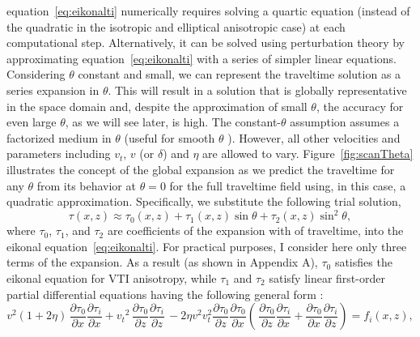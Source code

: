 

 equation~\ref{eq:eikonalti}  numerically requires
 solving a quartic equation (instead of the quadratic in the isotropic and elliptical
anisotropic case) at each computational step. Alternatively, it  can be solved using perturbation theory \cite[]{Bender}
by approximating equation~\ref{eq:eikonalti} with a series of simpler linear equations. Considering $\theta$
constant and small, we can represent the traveltime solution as a series expansion in $\theta$. This will result in a solution that is globally representative in the
space domain and, despite the approximation of small $\theta$, 
the accuracy for even large $\theta$, as we will see later, is high. The constant-$\theta$ assumption
assumes a factorized medium \cite[]{alkhalifah:1139}
 in $\theta$ (useful for smooth $\theta$ ). However,
all other velocities and parameters including $v_t$, $v$ (or $\delta$) and $\eta$ are allowed to vary.
Figure~\ref{fig:scanTheta} illustrates
the concept of the global expansion as we predict the traveltime for
any $\theta$ from its behavior at $\theta=0$ for the full traveltime
field
using, in this case, a quadratic approximation. Specifically, we
 substitute the following trial solution,
\begin{equation}
 \tau(x,z) \approx \tau_0(x,z) +\tau_1(x,z) \sin\theta+ \tau_2(x,z)  \sin^{2}\theta,
\label{eqn:n0e}
\end{equation}
where $\tau_0$,  $\tau_1$, and $\tau_2$ are coefficients of the
expansion with   of traveltime, into the eikonal equation~\ref{eq:eikonalti}.
For practical purposes, I consider here only three terms of the expansion. 
As a result  (as shown in Appendix A), $\tau_0$ satisfies the eikonal equation for VTI anisotropy, while $\tau_1$ and $\tau_2$
 satisfy linear first-order partial differential equations having  the following general form :
\begin{equation}
{v^2} (1+2 \eta) \,{\frac{\partial \tau_{0}}{\partial x}  \frac{\partial \tau_{i}}{\partial x}  } + 
    {{{v_t}}^2}\,{\frac{\partial \tau_{0}}{\partial z}  \frac{\partial \tau_{i}}{\partial z}}\,
     - 2 \eta {v^2} {v_{t}^2} \frac{\partial \tau_{0}}{\partial z} \frac{\partial \tau_{0}}{\partial x}  
     \left( \,{ \frac{\partial \tau_{0}}{\partial z}  \frac{\partial \tau_{i}}{\partial x}} +
    { \frac{\partial \tau_{0}}{\partial x}  \frac{\partial \tau_{i}}{\partial z}} \right) =
f_i(x,z),
\label{eqn:allorder}
\end{equation}
